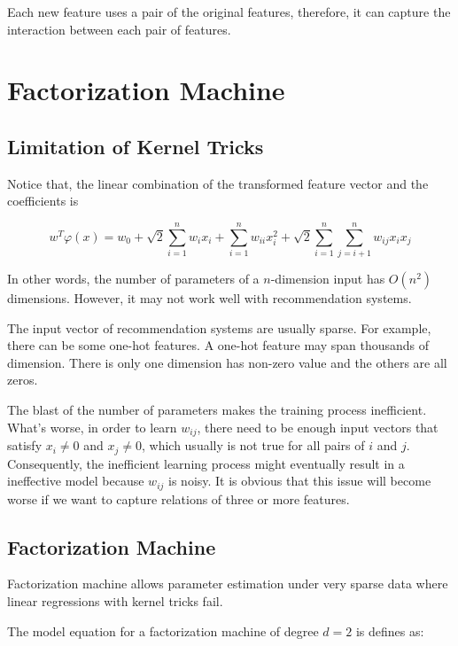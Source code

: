         Each new feature uses a pair of the original features,
        therefore, it can capture the interaction between each pair of features.

\section{Factorization Machine}

    \subsection{Limitation of Kernel Tricks}

        Notice that, the linear combination of the transformed feature vector and the coefficients is

        \[
        w^T\varphi(x) = w_0 + \sqrt{2}\sum_{i=1}^n w_ix_i
        + \sum_{i=1}^n w_{ii}x_i^2 + \sqrt{2}\sum_{i=1}^n\sum_{j=i+1}^n w_{ij}x_ix_j
        \]

        In other words, the number of parameters of a $n$-dimension input has $O(n^2)$ dimensions.
        However, it may not work well with recommendation systems.

        The input vector of recommendation systems are usually sparse.
        For example, there can be some one-hot features.
        A one-hot feature may span thousands of dimension.
        There is only one dimension has non-zero value and the others are all zeros.

        The blast of the number of parameters makes the training process inefficient.
        What's worse, in order to learn $w_{ij}$,
        there need to be enough input vectors that satisfy $x_i \neq 0$ and $x_j \neq 0$,
        which usually is not true for all pairs of $i$ and $j$.
        Consequently, the inefficient learning process might eventually result in a ineffective model
        because $w_{ij}$ is noisy.
        It is obvious that this issue will become worse if we want to capture relations of three or more features.

    \subsection{Factorization Machine}

        Factorization machine allows parameter estimation under very sparse data
        where linear regressions with kernel tricks fail. \cite{Rendle2010}

        The model equation for a factorization machine of degree $d=2$ is defines as:

